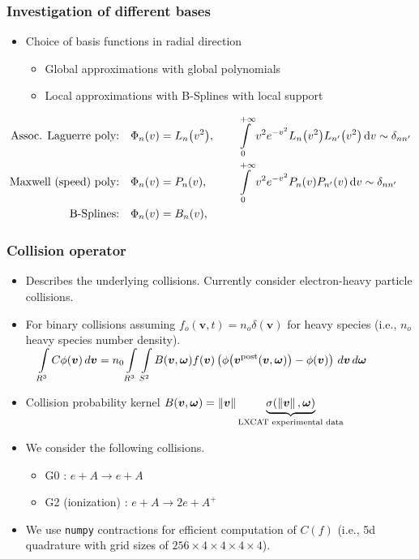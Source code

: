\documentclass[mathserif, aspectratio=169]{beamer}
\newcommand{\ud}{\,\mathrm{d}}
\newcommand{\vect}[1]{\boldsymbol{#1}}
\newcommand{\of}[1]{\mleft( #1 \mright)}
\newcommand{\myint}{\int\limits}
\newcommand{\diff}[1]{\, d#1}
\newcommand{\norm}[1]{\left\lVert#1\right\rVert}
\begin{document}
\begin{frame}
	\frametitle{Investigation of different bases}
	\begin{itemize}
		\item Choice of basis functions in radial direction
		\begin{itemize}
			\item Global approximations with global polynomials
			\item Local approximations with B-Splines with local support 
		\end{itemize}
	\end{itemize}
		\small
		\begin{align*}
		\textrm{Assoc. Laguerre poly:}
		& \quad \Phi_n\of{v} = L_n\of{v^2}, &&
		\quad 
		\myint_{0}^{+\infty} v^2 e^{-v^2} L_n\of{v^2} L_{n^\prime}\of{v^2} \ud v \sim \delta_{nn^\prime}
		\\
		\textrm{Maxwell (speed) poly:}
		& \quad \Phi_n\of{v} = P_n\of{v}, &&
		\quad 
		\myint_{0}^{+\infty} v^2 e^{-v^2} P_n\of{v} P_{n^\prime}\of{v} \ud v \sim \delta_{nn^\prime}
		\\
		\textrm{B-Splines:}
		& \quad \Phi_n\of{v} = B_n\of{v}, &&
		\end{align*}	
\end{frame}

\begin{frame}[fragile]
	\frametitle{Collision operator}
	\begin{itemize}
		\item Describes the underlying collisions. Currently consider electron-heavy particle collisions. 
		\item For binary collisions assuming $f_o(\vect{v},t)=n_o \delta(\vect{v})$ for heavy species (i.e., $n_o$ heavy species number density). \\
		$	\displaystyle
			\quad
			\myint_{R^3}{} C \phi\of{\vect{v}} \diff{\vect{v}} 
			=
			n_0 \myint_{R^3}{} \myint_{S^2}{} 
			B\of{\vect{v}, \vect{\omega}} 
			f\of{\vect{v}}
			\left(
			\phi\of{\vect{v}^\text{post}\of{\vect{v},\vect{\omega}}} 
			- \phi\of{\vect{v}} 
			\right)
			\diff{\vect{v}} \diff{\vect{\omega}}$
		\item Collision probability kernel $B\of{\vect{v}, \vect{\omega}}=\norm{\vect{v}} \underbrace{\sigma(\norm{\vect{v}}, \vect{\omega})}_{\text{LXCAT experimental data}}$
		\item We consider the following collisions. 
		\begin{itemize}
			\item G0 : $e + A \rightarrow e + A$ 
			\item G2 (ionization) : $e + A \rightarrow 2e + A^+$ 
		\end{itemize}
		\item We use \texttt{numpy} contractions for efficient computation of $C(f)$ (i.e., 5d quadrature with grid sizes of $256\times 4\times 4 \times 4 \times 4$). 
	\end{itemize}
\end{frame}
\end{document}
